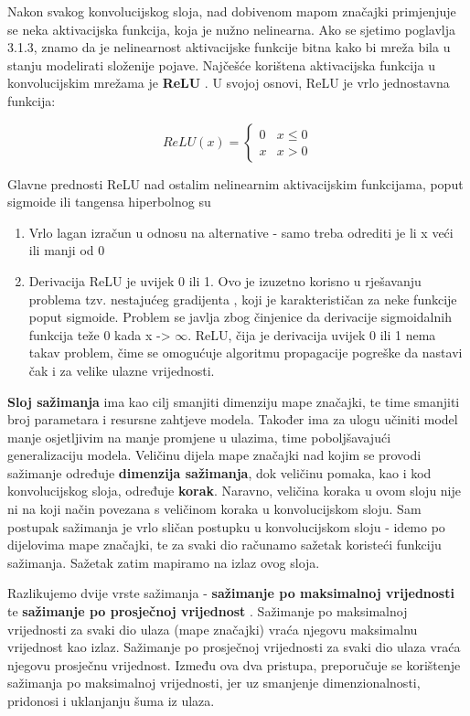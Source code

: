 \noindent Nakon svakog konvolucijskog sloja, nad dobivenom mapom značajki primjenjuje se neka aktivacijska funkcija, koja je nužno nelinearna. Ako se sjetimo poglavlja 3.1.3, znamo da je nelinearnost aktivacijske funkcije bitna kako bi mreža bila u stanju modelirati složenije pojave. Najčešće korištena aktivacijska funkcija u konvolucijskim mrežama je \textbf{ReLU} . U svojoj osnovi, ReLU je vrlo jednostavna funkcija:

$$ReLU(x) =\begin{cases}0 & x  \leq  0\\x & x > 0\end{cases} $$

\noindent Glavne prednosti ReLU nad ostalim nelinearnim aktivacijskim funkcijama, poput sigmoide ili tangensa hiperbolnog su 

\begin{enumerate}
  \item Vrlo lagan izračun u odnosu na alternative - samo treba odrediti je li x veći ili manji od 0
  \item Derivacija ReLU je uvijek 0 ili 1. Ovo je izuzetno korisno u rješavanju problema tzv. nestajućeg gradijenta , koji je karakterističan za neke funkcije poput sigmoide. Problem se javlja zbog činjenice da derivacije sigmoidalnih funkcija teže 0 kada x -> $\infty$. ReLU, čija je derivacija uvijek 0 ili 1 nema takav problem, čime se omogućuje algoritmu propagacije pogreške da nastavi čak i za velike ulazne vrijednosti.  \citep{baeldungReLU}
\end{enumerate}

\noindent \textbf{Sloj sažimanja}  ima kao cilj smanjiti dimenziju mape značajki, te time smanjiti broj parametara i resursne zahtjeve modela. Također ima za ulogu učiniti model manje osjetljivim na manje promjene u ulazima, time poboljšavajući generalizaciju modela. Veličinu dijela mape značajki nad kojim se provodi sažimanje određuje \textbf{dimenzija sažimanja}, dok veličinu pomaka, kao i kod konvolucijskog sloja, određuje \textbf{korak}. Naravno, veličina koraka u ovom sloju nije ni na koji način povezana s veličinom koraka u konvolucijskom sloju. Sam postupak sažimanja je vrlo sličan postupku u konvolucijskom sloju - idemo po dijelovima mape značajki, te za svaki dio računamo sažetak koristeći funkciju sažimanja. Sažetak zatim mapiramo na izlaz ovog sloja.

Razlikujemo dvije vrste sažimanja - \textbf{sažimanje po maksimalnoj vrijednosti}  te \textbf{sažimanje po prosječnoj vrijednost} . Sažimanje po maksimalnoj vrijednosti za svaki dio ulaza (mape značajki) vraća njegovu maksimalnu vrijednost kao izlaz. Sažimanje po prosječnoj vrijednosti za svaki dio ulaza vraća njegovu prosječnu vrijednost. Između ova dva pristupa, preporučuje se korištenje sažimanja po maksimalnoj vrijednosti, jer uz smanjenje dimenzionalnosti, pridonosi i uklanjanju šuma iz ulaza. \cite{towardsDSCNN} \\


